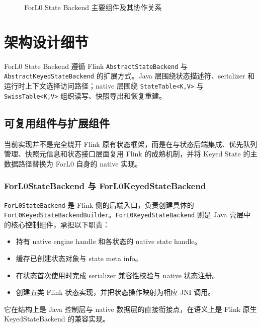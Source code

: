 \documentclass[a4paper,11pt]{article}
\newcommand{\project}{ForL0 State Backend}
\begin{document}
\begin{figure}[htbp]
\caption{\project{} 主要组件及其协作关系}
\label{fig:component}
\end{figure}

\section{架构设计细节}

\project{} 遵循 Flink \texttt{AbstractStateBackend} 与 \texttt{AbstractKeyedStateBackend} 的扩展方式。Java 层围绕状态描述符、serializer 和运行时上下文选择访问路径；native 层围绕 \texttt{StateTable<K,V>} 与 \texttt{SwissTable<K,V>} 组织读写、快照导出和恢复重建。

\subsection{可复用组件与扩展组件}

当前实现并不是完全绕开 Flink 原有状态框架，而是在与状态后端集成、优先队列管理、快照元信息和状态接口层面复用 Flink 的成熟机制，并将 Keyed State 的主数据路径替换为 ForL0 自身的 native 实现。

\subsubsection{ForL0StateBackend 与 ForL0KeyedStateBackend}

\texttt{ForL0StateBackend} 是 Flink 侧的后端入口，负责创建具体的 \texttt{ForL0KeyedStateBackendBuilder}。\texttt{ForL0KeyedStateBackend} 则是 Java 壳层中的核心控制组件，承担以下职责：

\begin{itemize}
  \item 持有 native engine handle 和各状态的 native state handle。
  \item 缓存已创建状态对象与 state meta info。
  \item 在状态首次使用时完成 serializer 兼容性校验与 native 状态注册。
  \item 创建五类 Flink 状态实现，并把状态操作映射为相应 JNI 调用。
\end{itemize}

它在结构上是 Java 控制层与 native 数据层的直接衔接点，在语义上是 Flink 原生 KeyedStateBackend 的兼容实现。
\end{document}
